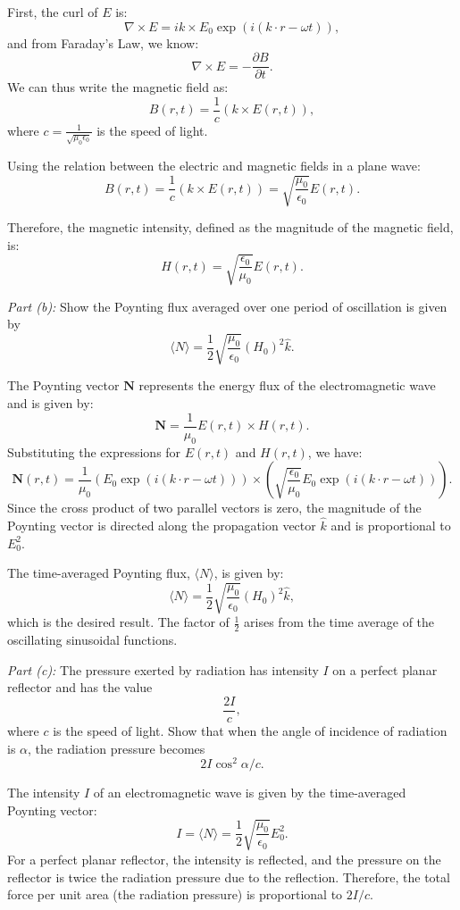 \documentclass{article}
\begin{document}
First, the curl of \(E\) is:
\[
\nabla \times E = i k \times E_0 \exp(i(k \cdot r - \omega t)),
\]
and from Faraday’s Law, we know:
\[
\nabla \times E = - \frac{\partial B}{\partial t}.
\]
We can thus write the magnetic field as:
\[
B(r, t) = \frac{1}{c} (k \times E(r, t)),
\]
where \(c = \frac{1}{\sqrt{\mu_0 \epsilon_0}}\) is the speed of light.

Using the relation between the electric and magnetic fields in a plane wave:
\[
B(r, t) = \frac{1}{c} (k \times E(r, t)) = \sqrt{\frac{\mu_0}{\epsilon_0}} E(r, t).
\]

Therefore, the magnetic intensity, defined as the magnitude of the magnetic field, is:
\[
H(r, t) = \sqrt{\frac{\epsilon_0}{\mu_0}} E(r, t).
\]

\textit{Part (b):} Show the Poynting flux averaged over one period of oscillation is given by
\[
\langle N \rangle = \frac{1}{2} \sqrt{\frac{\mu_0}{\epsilon_0}} (H_0)^2 \hat{k}.
\]

The Poynting vector \( \mathbf{N} \) represents the energy flux of the electromagnetic wave and is given by:
\[
\mathbf{N} = \frac{1}{\mu_0} E(r,t) \times H(r,t).
\]
Substituting the expressions for \(E(r,t)\) and \(H(r,t)\), we have:
\[
\mathbf{N}(r, t) = \frac{1}{\mu_0} \left( E_0 \exp(i(k \cdot r - \omega t)) \right) \times \left( \sqrt{\frac{\epsilon_0}{\mu_0}} E_0 \exp(i(k \cdot r - \omega t)) \right).
\]
Since the cross product of two parallel vectors is zero, the magnitude of the Poynting vector is directed along the propagation vector \(\hat{k}\) and is proportional to \(E_0^2\).

The time-averaged Poynting flux, \( \langle N \rangle \), is given by:
\[
\langle N \rangle = \frac{1}{2} \sqrt{\frac{\mu_0}{\epsilon_0}} (H_0)^2 \hat{k},
\]
which is the desired result. The factor of \(\frac{1}{2}\) arises from the time average of the oscillating sinusoidal functions.

\textit{Part (c):} The pressure exerted by radiation has intensity \(I\) on a perfect planar reflector and has the value
\[
\frac{2I}{c},
\]
where \(c\) is the speed of light. Show that when the angle of incidence of radiation is \(\alpha\), the radiation pressure becomes
\[
2I \cos^2 \alpha / c.
\]

The intensity \(I\) of an electromagnetic wave is given by the time-averaged Poynting vector:
\[
I = \langle N \rangle = \frac{1}{2} \sqrt{\frac{\mu_0}{\epsilon_0}} E_0^2.
\]
For a perfect planar reflector, the intensity is reflected, and the pressure on the reflector is twice the radiation pressure due to the reflection. Therefore, the total force per unit area (the radiation pressure) is proportional to \(2I/c\).
\end{document}
